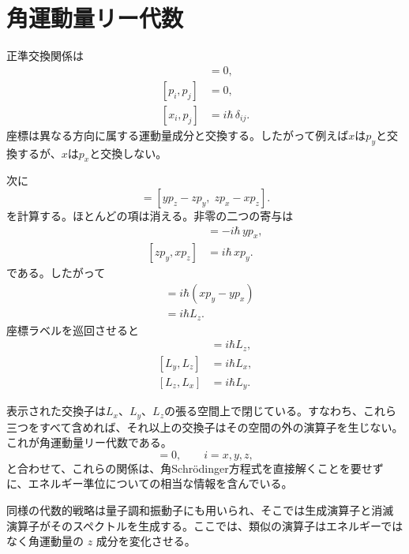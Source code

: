 \section{角運動量リー代数}

正準交換関係は
\begin{align}
[x_i,x_j]&=0,\\
[p_i,p_j]&=0,\\
[x_i,p_j]&=i\hbar\,\delta_{ij}.
\end{align}
座標は異なる方向に属する運動量成分と交換する。したがって例えば\(x\)は\(p_y\)と交換するが、\(x\)は\(p_x\)と交換しない。

次に
\begin{equation}
[L_x,L_y]
=
[yp_z-zp_y,\;zp_x-xp_z].
\end{equation}
を計算する。ほとんどの項は消える。非零の二つの寄与は
\begin{align}
[yp_z,zp_x]&=-i\hbar\,yp_x,\\
[zp_y,xp_z]&=i\hbar\,xp_y.
\end{align}
である。したがって
\begin{align}
[L_x,L_y]
&=i\hbar\left(xp_y-yp_x\right)\\
&=i\hbar L_z.
\end{align}
座標ラベルを巡回させると
\begin{align}
[L_x,L_y]&=i\hbar L_z,\\
[L_y,L_z]&=i\hbar L_x,\\
[L_z,L_x]&=i\hbar L_y.
\end{align}

\begin{classroomqa}
\end{classroomqa}

表示された交換子は\(L_x\)、\(L_y\)、\(L_z\)の張る空間上で閉じている。すなわち、これら三つをすべて含めれば、それ以上の交換子はその空間の外の演算子を生じない。これが角運動量リー代数である。
\begin{equation}
[H,L_i]=0,
\qquad i=x,y,z,
\end{equation}
と合わせて、これらの関係は、角Schr\"odinger方程式を直接解くことを要せずに、エネルギー準位についての相当な情報を含んでいる。

同様の代数的戦略は量子調和振動子にも用いられ、そこでは生成演算子と消滅演算子がそのスペクトルを生成する。ここでは、類似の演算子はエネルギーではなく角運動量の \(z\) 成分を変化させる。

